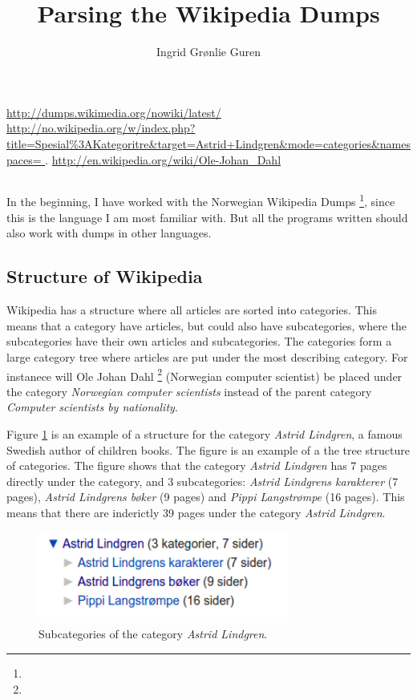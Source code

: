 \documentclass[11pt,english,a4paper]{article}
\title{Parsing the Wikipedia Dumps}
\author{Ingrid Grønlie Guren}
\begin{document}
\maketitle

\urldef\nowikidump\url{http://dumps.wikimedia.org/nowiki/latest/}
\urldef\categorytree\url{http://no.wikipedia.org/w/index.php?title=Spesial%3AKategoritre&target=Astrid+Lindgren&mode=categories&namespaces= }.
\urldef\olejohandahleng\url{http://en.wikipedia.org/wiki/Ole-Johan_Dahl}


\subsection*{}
In the beginning, I have worked with the Norwegian Wikipedia Dumps \footnote{\nowikidump}, since this is the language I am most familiar with. But all the programs written should also work with dumps in other languages.  


\subsection*{Structure of Wikipedia}
Wikipedia has a structure where all articles are sorted into categories. This means that a category have articles, but could also have subcategories, where the subcategories have their own articles and subcategories. The categories form a large category tree where articles are put under the most describing category. For instanece will Ole Johan Dahl \footnote{\olejohandahleng} (Norwegian computer scientist) be placed under the category \textit{Norwegian computer scientists} instead of the parent category \textit{Computer scientists by nationality}.

Figure \ref{fig: subcat_lindgren} is an example of a structure for the category \textit{Astrid Lindgren}, a famous Swedish author of children books. The figure is an example of a the tree structure of categories. The figure shows that the category \textit{Astrid Lindgren} has 7 pages directly under the category, and 3 subcategories: \textit{Astrid Lindgrens karakterer} (7 pages), \textit{Astrid Lindgrens bøker} (9 pages) and \textit{Pippi Langstrømpe} (16 pages).  This means that there are inderictly 39 pages under the category \textit{Astrid Lindgren}. 


\begin{figure}
\centering
\includegraphics[height=3cm]{Dumps/imgs/Kategorier-Astrid-Lindgren.png}
\caption{Subcategories of the category \textit{Astrid Lindgren}. }
\label{fig: subcat_lindgren}
\end{figure}
\end{document}
